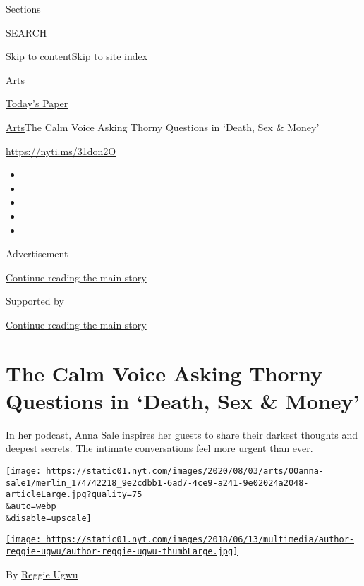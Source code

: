 Sections

SEARCH

\protect\hyperlink{site-content}{Skip to
content}\protect\hyperlink{site-index}{Skip to site index}

\href{https://www.nytimes.com/section/arts}{Arts}

\href{https://myaccount.nytimes.com/auth/login?response_type=cookie\&client_id=vi}{}

\href{https://www.nytimes.com/section/todayspaper}{Today's Paper}

\href{/section/arts}{Arts}\textbar{}The Calm Voice Asking Thorny
Questions in `Death, Sex \& Money'

\url{https://nyti.ms/31don2O}

\begin{itemize}
\item
\item
\item
\item
\item
\end{itemize}

Advertisement

\protect\hyperlink{after-top}{Continue reading the main story}

Supported by

\protect\hyperlink{after-sponsor}{Continue reading the main story}

\hypertarget{the-calm-voice-asking-thorny-questions-in-death-sex--money}{%
\section{The Calm Voice Asking Thorny Questions in `Death, Sex \&
Money'}\label{the-calm-voice-asking-thorny-questions-in-death-sex--money}}

In her podcast, Anna Sale inspires her guests to share their darkest
thoughts and deepest secrets. The intimate conversations feel more
urgent than ever.

\texttt{[image: https://static01.nyt.com/images/2020/08/03/arts/00anna-sale1/merlin\_174742218\_9e2cdbb1-6ad7-4ce9-a241-9e02024a2048-articleLarge.jpg?quality=75\\\&auto=webp\\\&disable=upscale]}

\href{https://www.nytimes.com/by/reggie-ugwu}{\texttt{[image: https://static01.nyt.com/images/2018/06/13/multimedia/author-reggie-ugwu/author-reggie-ugwu-thumbLarge.jpg]}}

By \href{https://www.nytimes.com/by/reggie-ugwu}{Reggie Ugwu}


